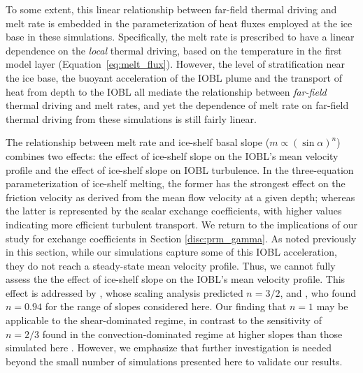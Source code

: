 \documentclass[tc, manuscript]{copernicus}
\begin{document}
To some extent, this linear relationship between far-field thermal driving and melt rate is embedded in the parameterization of heat fluxes employed at the ice base in these simulations. Specifically, the melt rate is prescribed to have a linear dependence on the \textit{local} thermal driving, based on the temperature in the first model layer (Equation~\ref{eq:melt_flux}). However, the level of stratification near the ice base, the buoyant acceleration of the IOBL plume and the transport of heat from depth to the IOBL all mediate the relationship between \textit{far-field} thermal driving and melt rates, and yet the dependence of melt rate on far-field thermal driving from these simulations is still fairly linear.  

The relationship between melt rate and ice-shelf basal slope ($m \propto (\sin\alpha)^{n}$) combines two effects: the effect of ice-shelf slope on the IOBL's mean velocity profile and the effect of ice-shelf slope on IOBL turbulence. In the three-equation parameterization of ice-shelf melting, the former has the strongest effect on the friction velocity as derived from the mean flow velocity at a given depth; whereas the latter is represented by the scalar exchange coefficients, with higher values indicating more efficient turbulent transport. We return to the implications of our study for exchange coefficients in Section \ref{disc:prm_gamma}. As noted previously in this section, while our simulations capture some of this IOBL acceleration, they do not reach a steady-state mean velocity profile. Thus, we cannot fully assess the the effect of ice-shelf slope on the IOBL's mean velocity profile. This effect is addressed by \citet{magorrian_turbulent_2016}, whose scaling analysis predicted $n=3/2$, and \citet{little_how_2009}, who found $n=0.94$ for the range of slopes considered here. Our finding that $n=1$ may be applicable to the shear-dominated regime, in contrast to the sensitivity of $n=2/3$ found in the convection-dominated regime at higher slopes than those simulated here \citep[5\unit{^{\circ}} -- 90\unit{^{\circ}};][]{mcconnochie_dissolution_2018, mondal_ablation_2019}. However, we emphasize that further investigation is needed beyond the small number of simulations presented here to validate our results. 
\end{document}
